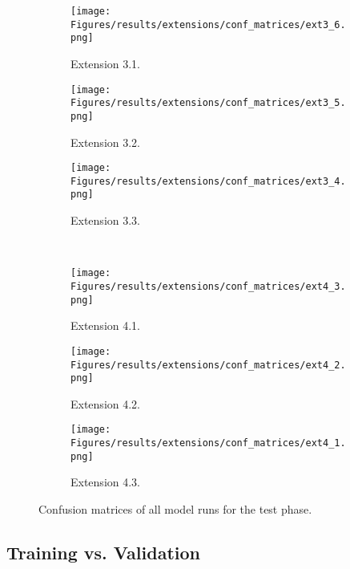 \begin{figure}[htb]
    \centering
    \begin{adjustbox}{center}
        \begin{subfigure}{.43\textwidth}
            \centering
            \texttt{[image: Figures/results/extensions/conf\_matrices/ext3\_6.png]}
            \caption{Extension 3.1.}
        \end{subfigure}
        \begin{subfigure}{.355\textwidth}
            \centering
            \texttt{[image: Figures/results/extensions/conf\_matrices/ext3\_5.png]}
            \caption{Extension 3.2.}
        \end{subfigure}
        \begin{subfigure}{.355\textwidth}
            \centering
            \texttt{[image: Figures/results/extensions/conf\_matrices/ext3\_4.png]}
            \caption{Extension 3.3.}
        \end{subfigure}
    \end{adjustbox}
    \\[0.66cm]
    \begin{adjustbox}{center}
        \begin{subfigure}{.43\textwidth}
            \centering
            \texttt{[image: Figures/results/extensions/conf\_matrices/ext4\_3.png]}
            \caption{Extension 4.1.}
        \end{subfigure}
        \begin{subfigure}{.355\textwidth}
            \centering
            \texttt{[image: Figures/results/extensions/conf\_matrices/ext4\_2.png]}
            \caption{Extension 4.2.}
        \end{subfigure}
        \begin{subfigure}{.355\textwidth}
            \centering
            \texttt{[image: Figures/results/extensions/conf\_matrices/ext4\_1.png]}
            \caption{Extension 4.3.}
        \end{subfigure}
    \end{adjustbox}
    \caption[Confusion Matrices of All Model Runs]{Confusion matrices of all model runs for the test phase.}
\end{figure}

\clearpage

\subsection{Training vs. Validation }
\label{app:acc}

